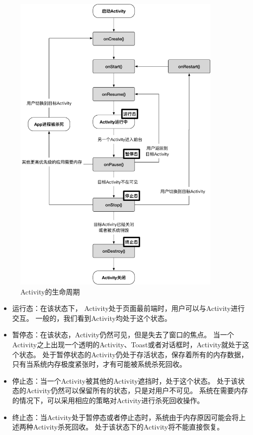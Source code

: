 \begin{figure}[!ht]
	\centering
	\includegraphics[width=0.9\textwidth]{./Figures/Activity-lifecycle.png}
	\caption{Activity的生命周期}
	\label{fig:Activity-lifecycle}
\end{figure}


\begin{itemize}
		\setlength{\itemsep}{-5pt}
		
	\item 运行态：在该状态下， Activity处于页面最前端时，用户可以与Activity进行交互。
	一般的，我们看到Activity均处于这个状态。
	
	\item 暂停态：在该状态，Activity仍然可见，但是失去了窗口的焦点。
	当一个Activity之上出现一个透明的Activity、Toast或者对话框时，Activity就处于这个状态。
	处于暂停状态的Activity仍处于存活状态，保存着所有的内存数据，只有当系统内存极度紧张时，才有可能被系统杀死回收。
	
	\item 停止态：当一个Activity被其他的Activity遮挡时，处于这个状态。
	处于该状态的Activity仍然可以保留所有的状态，只是对用户不可见。
	系统在需要内存的情况下，可以采用相应的策略对Activity进行杀死回收操作。
	
	\item 终止态：当Activity处于暂停态或者停止态时，系统由于内存原因可能会将上述两种Activity杀死回收。
	处于该状态下的Activity将不能直接恢复。
\end{itemize}


